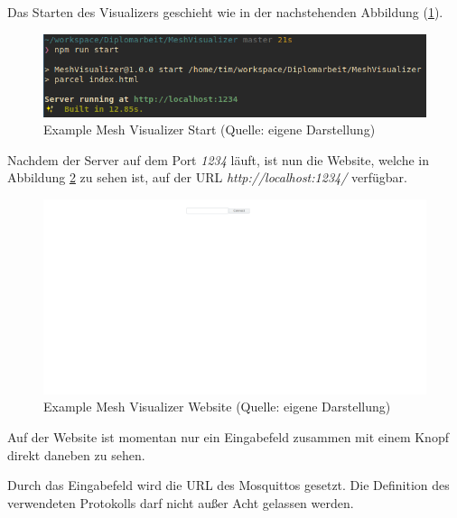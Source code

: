 Das Starten des Visualizers geschieht wie in der nachstehenden Abbildung (\ref{abb:example_mesh_visualizer_start}).

\begin{figure}[H]
    \begin{center}
        \includegraphics[scale=.6]{images/example_mesh_visualizer_start.png}
        \caption{Example Mesh Visualizer Start (Quelle: eigene Darstellung)}
        \label{abb:example_mesh_visualizer_start}
    \end{center}
\end{figure}

Nachdem der Server auf dem Port \textit{1234} läuft, ist nun die Website, welche in Abbildung \ref{abb:example_mesh_visualizer_website} zu sehen ist, auf der URL \textit{http://localhost:1234/} verfügbar.

\begin{figure}[H]
    \begin{center}
        \includegraphics[scale=.3]{images/example_mesh_visualizer_website.png}
        \caption{Example Mesh Visualizer Website (Quelle: eigene Darstellung)}
        \label{abb:example_mesh_visualizer_website}
    \end{center}
\end{figure}

Auf der Website ist momentan nur ein Eingabefeld zusammen mit einem Knopf direkt daneben zu sehen.

Durch das Eingabefeld wird die URL des Mosquittos gesetzt. 
Die Definition des verwendeten Protokolls darf nicht außer Acht gelassen werden.\newline

